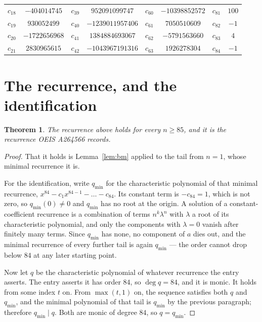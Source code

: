 \documentclass[11pt,a4paper]{article}
\theoremstyle{plain}
\newtheorem{theorem}{Theorem}
\theoremstyle{definition}
\begin{document}
\begin{center}
\begin{tabular}{cccccccc}
$c_{18}$ & $-404014745$ & $c_{39}$ & $952091099747$ & $c_{60}$ & $-10398852572$ & $c_{81}$ & $100$ \\
$c_{19}$ & $930052499$ & $c_{40}$ & $-1239011957406$ & $c_{61}$ & $7050510609$ & $c_{82}$ & $-1$ \\
$c_{20}$ & $-1722656968$ & $c_{41}$ & $1384884693067$ & $c_{62}$ & $-5791563660$ & $c_{83}$ & $4$ \\
$c_{21}$ & $2830965615$ & $c_{42}$ & $-1043967191316$ & $c_{63}$ & $1926278304$ & $c_{84}$ & $-1$ \\
\end{tabular}
\end{center}

\section{The recurrence, and the identification}

\begin{theorem}
The recurrence above holds for every $n\ge85$, and it is the recurrence OEIS A264566 records.
\end{theorem}

\begin{proof}
That it holds is Lemma~\ref{lem:bm} applied to the tail from $n=1$, whose minimal
recurrence it is.

For the identification, write $q_{\min}$ for the characteristic polynomial of that minimal
recurrence, $x^{84}-c_1x^{84-1}-\dots-c_{84}$. Its constant term is
$-c_{84}=1$, which is not zero, so $q_{\min}(0)\neq0$ and $q_{\min}$ has no
root at the origin. A solution of a constant-coefficient recurrence is a combination of terms
$n^{k}\lambda^{n}$ with $\lambda$ a root of its characteristic polynomial, and only the
components with $\lambda=0$ vanish after finitely many terms. Since $q_{\min}$ has none, no
component of $a$ dies out, and the minimal recurrence of every further tail is again
$q_{\min}$ --- the order cannot drop below $84$ at any later starting point.

Now let $q$ be the characteristic polynomial of whatever recurrence the entry asserts. The
entry asserts it has order $84$, so $\deg q=84$, and it is monic. It holds from some
index $t$ on. From $\max(t,1)$ on, the sequence satisfies both $q$ and $q_{\min}$, and
the minimal polynomial of that tail is $q_{\min}$ by the previous paragraph; therefore
$q_{\min}\mid q$. Both are monic of degree $84$, so $q=q_{\min}$.
\end{proof}
\end{document}
